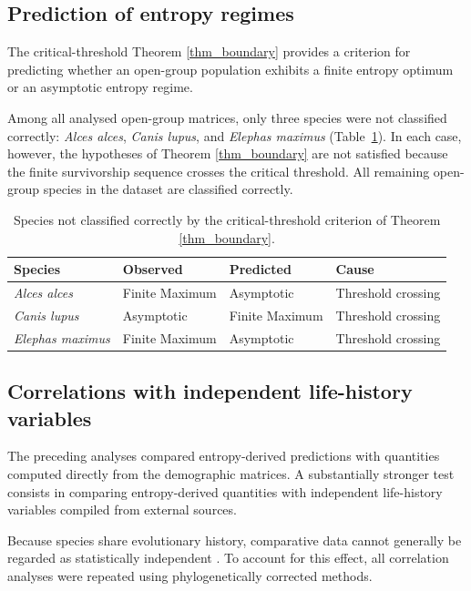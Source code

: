 \documentclass[10pt,a4paper]{amsart}
\theoremstyle{definition}
\theoremstyle{remark}
\numberwithin{equation}{section}
\begin{document}
\subsection{Prediction of entropy regimes}

The critical-threshold Theorem \ref{thm_boundary} provides a criterion
for predicting whether an open-group population exhibits a finite
entropy optimum or an asymptotic entropy regime.

Among all analysed open-group matrices, only three species were not
classified correctly:
\emph{Alces alces},
\emph{Canis lupus},
and \emph{Elephas maximus}
(Table~\ref{tab:CriticalTheoremExceptions}).
In each case, however, the hypotheses of Theorem
\ref{thm_boundary} are not satisfied because the finite survivorship
sequence crosses the critical threshold. All remaining open-group
species in the dataset are classified correctly.

\begin{table}[htbp]
\centering
\caption{Species not classified correctly by the critical-threshold criterion of Theorem \ref{thm_boundary}.}
\label{tab:CriticalTheoremExceptions}
\begin{tabular}{llll}
\hline
Species & Observed & Predicted & Cause \\
\hline
\emph{Alces alces} &
Finite Maximum &
Asymptotic &
Threshold crossing \\

\emph{Canis lupus} &
Asymptotic &
Finite Maximum &
Threshold crossing \\

\emph{Elephas maximus} &
Finite Maximum &
Asymptotic &
Threshold crossing \\
\hline
\end{tabular}
\end{table}

\subsection{Correlations with independent life-history variables}\label{subsec_phylogenetic}

The preceding analyses compared entropy-derived predictions with
quantities computed directly from the demographic matrices.
A substantially stronger test consists in comparing entropy-derived
quantities with independent life-history variables compiled from
external sources.

Because species share evolutionary history, comparative data cannot
generally be regarded as statistically independent
\cite{Felsenstein1985,Freckleton2002}. To account for this effect,
all correlation analyses were repeated using phylogenetically
corrected methods.
\end{document}
